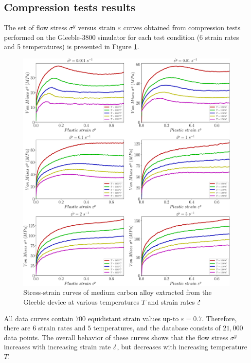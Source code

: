 \documentclass[twoside,english,1p,final,sort&compress]{elsarticle}
\theoremstyle{plain}
\DeclareRobustCommand{\mdot}[1]{\accentset{\mbox{\bfseries .}}{#1}}
\begin{document}
\subsection{Compression tests results\label{sec:ComTestResults}}

The set of flow stress $\sigma^y$ versus strain $\varepsilon$ curves obtained from compression tests performed on the Gleeble-3800 simulator for each test condition (6 strain rates and 5 temperatures) is presented in Figure \ref{fig:RawData}.
\begin{figure}[!ht]
\centering
\includegraphics[width=\columnwidth]{Figures/rawData}
\caption{Stress-strain curves of medium carbon alloy extracted from the Gleeble device at various temperatures $T$ and strain rates $\mdot\varepsilon$}
\label{fig:RawData}
\end{figure}
All data curves contain $700$ equidistant strain values up-to $\varepsilon=0.7$.
Therefore, there are $6$ strain rates and $5$ temperatures, and the database consists of $21,000$ data points.
The overall behavior of these curves shows that the flow stress $\sigma^y$ increases with increasing strain rate $\mdot\varepsilon$, but decreases with increasing temperature $T$.
\end{document}
